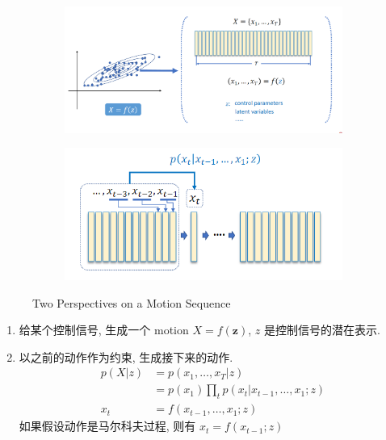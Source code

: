 \begin{figure}[!htb]
    \centering
    \begin{subfigure}{0.88\linewidth}
        \centering
        \includegraphics[width=\linewidth]{pic/1056/Learning Motion Models1}
    \end{subfigure}
    \begin{subfigure}{0.88\linewidth}
        \centering
        \includegraphics[width=\linewidth]{pic/1056/Learning Motion Models2}
    \end{subfigure}
    \caption{Two Perspectives on a Motion Sequence}
\end{figure}


\begin{enumerate}
    \item 给某个控制信号, 生成一个 motion $X=f(\bm z)$, $z$ 是控制信号的潜在表示. 
    \item 以之前的动作作为约束, 生成接下来的动作.
    \begin{align*}
        p(X|z)&=p(x_1,\dots,x_T|z)\\
        &=p(x_1)\prod_tp(x_t|x_{t-1},\dots,x_1;z)\\
        x_t &= f(x_{t-1},\dots,x_1;z)
    \end{align*}
    如果假设动作是马尔科夫过程, 则有 $x_t=f(x_{t-1};z)$
\end{enumerate}

